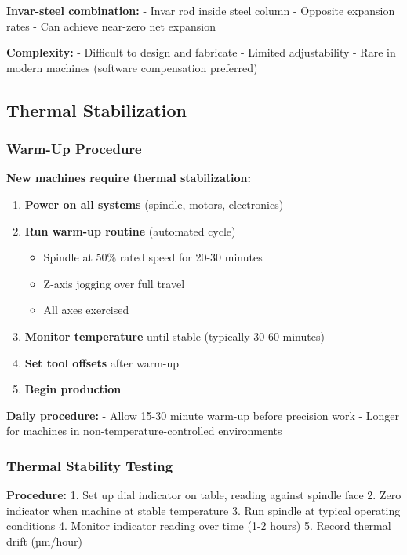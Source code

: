 \documentclass[
]{article}
\providecommand{\tightlist}{%
  \setlength{\itemsep}{0pt}\setlength{\parskip}{0pt}}
\begin{document}
\textbf{Invar-steel combination:} - Invar rod inside steel column -
Opposite expansion rates - Can achieve near-zero net expansion

\textbf{Complexity:} - Difficult to design and fabricate - Limited
adjustability - Rare in modern machines (software compensation
preferred)

\subsection{Thermal Stabilization}\label{thermal-stabilization}

\subsubsection{Warm-Up Procedure}\label{warm-up-procedure}

\textbf{New machines require thermal stabilization:}

\begin{enumerate}
\def\labelenumi{\arabic{enumi}.}
\tightlist
\item
  \textbf{Power on all systems} (spindle, motors, electronics)
\item
  \textbf{Run warm-up routine} (automated cycle)

  \begin{itemize}
  \tightlist
  \item
    Spindle at 50\% rated speed for 20-30 minutes
  \item
    Z-axis jogging over full travel
  \item
    All axes exercised
  \end{itemize}
\item
  \textbf{Monitor temperature} until stable (typically 30-60 minutes)
\item
  \textbf{Set tool offsets} after warm-up
\item
  \textbf{Begin production}
\end{enumerate}

\textbf{Daily procedure:} - Allow 15-30 minute warm-up before precision
work - Longer for machines in non-temperature-controlled environments

\subsubsection{Thermal Stability
Testing}\label{thermal-stability-testing}

\textbf{Procedure:} 1. Set up dial indicator on table, reading against
spindle face 2. Zero indicator when machine at stable temperature 3. Run
spindle at typical operating conditions 4. Monitor indicator reading
over time (1-2 hours) 5. Record thermal drift (µm/hour)
\end{document}
